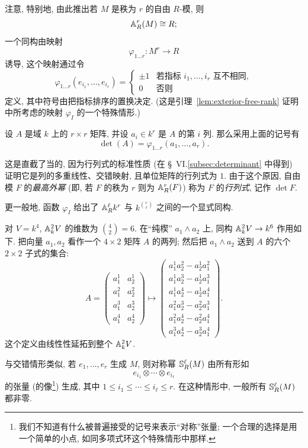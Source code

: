 注意, 特别地, 由此推出若 $M$ 是秩为 $r$ 的自由 $R$-模, 则
\[
\mathbb{A}_R^r(M)\cong R;
\]
一个同构由映射
\[
\varphi_{1\dots r}:M^r\longrightarrow R
\]
诱导, 这个映射通过令
\[
\varphi_{1\dots r}(e_{i_1},\dots,e_{i_r})=
\begin{cases}
\pm 1 & \text{若指标 }i_1,\dots,i_r\text{ 互不相同},\\
0 & \text{否则}
\end{cases}
\]
定义, 其中符号由把指标排序的置换决定. (这是引理~\ref{lem:exterior-free-rank} 证明中所考虑的映射 $\varphi_I$ 的一个特殊情形.)

\begin{claim}\label{claim:det-exterior}
设 $A$ 是域 $k$ 上的 $r\times r$ 矩阵, 并设 $a_i\in k^r$ 是 $A$ 的第 $i$ 列. 那么采用上面的记号有
\[
\det(A)=\varphi_{1\dots r}(a_1,\dots,a_r).
\]
\end{claim}

这是直截了当的, 因为行列式的标准性质 (在 \S~VI.\ref{subsec:determinant} 中得到) 证明它是列的多重线性、交错映射, 且单位矩阵的行列式为 $1$. 由于这个原因, 自由模 $F$ 的\emph{最高外幂} (即, 若 $F$ 的秩为 $r$ 则为 $\mathbb{A}_R^r(F)$) 称为 $F$ 的\emph{行列式}, 记作 $\det F$.

更一般地, 函数 $\varphi_I$ 给出了 $\mathbb{A}_R^\ell k^r$ 与 $k^{\binom{r}{\ell}}$ 之间的一个显式同构.

\begin{example}\label{ex:exterior-minors}
对 $V=k^4$, $\mathbb{A}_k^2 V$ 的维数为 $\binom{4}{2}=6$. 在``纯楔'' $a_1\wedge a_2$ 上, 同构 $\mathbb{A}_k^2 V\to k^6$ 作用如下. 把向量 $a_1,a_2$ 看作一个 $4\times2$ 矩阵 $A$ 的两列; 然后把 $a_1\wedge a_2$ 送到 $A$ 的六个 $2\times2$ 子式的集合:
\[
A=\begin{pmatrix}
a_1^1 & a_2^1\\
a_1^2 & a_2^2\\
a_1^3 & a_2^3\\
a_1^4 & a_2^4
\end{pmatrix}
\longmapsto
\begin{pmatrix}
a_1^1a_2^2-a_2^1a_1^2\\
a_1^1a_2^3-a_2^1a_1^3\\
a_1^1a_2^4-a_2^1a_1^4\\
a_1^2a_2^3-a_2^2a_1^3\\
a_1^2a_2^4-a_2^2a_1^4\\
a_1^3a_2^4-a_2^3a_1^4
\end{pmatrix}.
\]
这个定义由线性性延拓到整个 $\mathbb{A}_k^2 V$.
\end{example}

与交错情形类似, 若 $e_1,\dots,e_r$ 生成 $M$, 则对称幂 $\mathbb{S}_R^\ell(M)$ 由所有形如
\[
e_{i_1}\otimes\cdots\otimes e_{i_\ell}
\]
的张量 (的像\footnote{我们不知道有什么被普遍接受的记号来表示``对称''张量; 一个合理的选择是用一个简单的小点, 如同多项式环这个特殊情形中那样.}) 生成, 其中 $1\le i_1\le\cdots\le i_\ell\le r$. 在这种情形中, 一般所有 $\mathbb{S}_R^\ell(M)$ 都非零.

